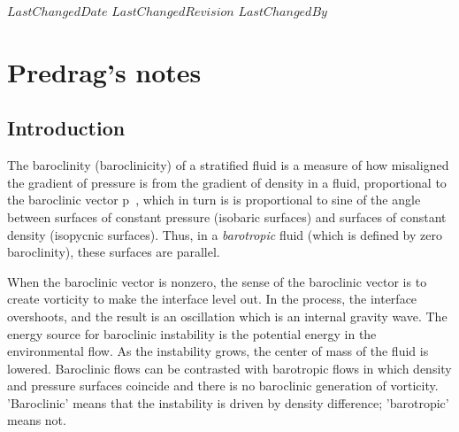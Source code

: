 {$LastChangedDate$}
{$LastChangedRevision$} {$LastChangedBy$}

\chapter{Predrag's notes}
\label{chap:PCnotes}

\section{Introduction}
\label{s:PCintro}

The baroclinity (baroclinicity) of a stratified fluid is a measure of how
misaligned the gradient of pressure is from the gradient of density in a
fluid, proportional to the baroclinic vector
\beq
{} \nabla \rho \times \nabla p
\,,
which in turn is is proportional to sine of the angle between surfaces of
constant pressure (isobaric surfaces) and surfaces of constant density
(isopycnic surfaces). Thus, in a \emph{barotropic} fluid (which is
defined by zero baroclinity), these surfaces are parallel.

When the baroclinic vector is nonzero, the sense of the baroclinic vector
is to create vorticity to make the interface level out. In the process,
the interface overshoots, and the result is an oscillation which is an
internal gravity wave. The energy source for baroclinic instability is
the potential energy in the environmental flow. As the instability grows,
the center of mass of the fluid is lowered. Baroclinic flows can be
contrasted with barotropic flows in which density and pressure surfaces
coincide and there is no baroclinic generation of vorticity. 'Baroclinic'
means that the instability is driven by density difference; 'barotropic'
means not.

